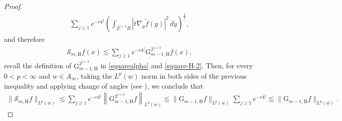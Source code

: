 \documentclass[11pt, a4paper,leqno]{amsart}
\theoremstyle{plain}
\theoremstyle{definition}
\theoremstyle{remark}
\numberwithin{equation}{section}
\def \Scal{ \mathcal{S} }
\def \hh{ \mathrm{H} }
\def \Grm{ \mathrm{G} }
\begin{document}
\begin{proof}
\begin{align*}
\sum_{j\geq 1} e^{-c4^j}
 \left(\int_{2^{j+2}B}|t\nabla_y \widetilde{f}(y)|^2\,dy\right)^{\frac{1}{2}},
\end{align*}
and therefore 
\begin{align*}
\Scal_{m,\hh}f(x)\lesssim 
\sum_{j\geq 1} e^{-c4^j}
\Grm_{m-1,\hh}^{2^{j+3}}f(x),
\end{align*}
recall the definition of $\Grm_{m-1,\hh}^{2^{j+3}}$ in \eqref{squarealpha} and \eqref{square-H-2}.
Then, for every $0<p<\infty$ and $w\in A_{\infty}$, taking the $L^p(w)$ norm in both sides of the previous inequality and applying change of angles (see \cite[Proposition 3.2]{MartellPrisuelos}), 
we conclude that
\begin{align*}
\|\Scal_{m,\hh}f\|_{L^p(w)}\lesssim \sum_{j\geq 1} e^{-c4^j}
\left\|\Grm_{m-1,\hh}^{2^{j+3}}f\right\|_{L^p(w)}
\lesssim \|\Grm_{m-1,\hh}f\|_{L^p(w)}\sum_{j\geq 1}e^{-c4^j}
\lesssim \|\Grm_{m-1,\hh}f\|_{L^p(w)}.
\end{align*}




\medskip












\end{proof}
\end{document}
